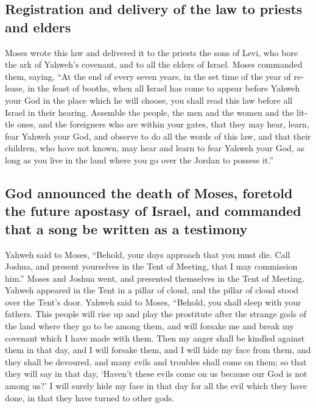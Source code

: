 \begin{paracol}{2}
\begin{otherlanguage}{english}
\hypertarget{registration-and-delivery-of-the-law-to-priests-and-elders}{%
\subsection{Registration and delivery of the law to priests and
elders}\label{registration-and-delivery-of-the-law-to-priests-and-elders}}

 Moses wrote this law and delivered it to the priests the
sons of Levi, who bore the ark of Yahweh's covenant, and to all the
elders of Israel.  Moses commanded them, saying, ``At the
end of every seven years, in the set time of the year of release, in the
feast of booths,  when all Israel has come to appear
before Yahweh your God in the place which he will choose, you shall read
this law before all Israel in their hearing.  Assemble
the people, the men and the women and the little ones, and the
foreigners who are within your gates, that they may hear, learn, fear
Yahweh your God, and observe to do all the words of this law,
 and that their children, who have not known, may hear
and learn to fear Yahweh your God, as long as you live in the land where
you go over the Jordan to possess it.''

\hypertarget{god-announced-the-death-of-moses-foretold-the-future-apostasy-of-israel-and-commanded-that-a-song-be-written-as-a-testimony}{%
\subsection{God announced the death of Moses, foretold the future
apostasy of Israel, and commanded that a song be written as a
testimony}\label{god-announced-the-death-of-moses-foretold-the-future-apostasy-of-israel-and-commanded-that-a-song-be-written-as-a-testimony}}

 Yahweh said to Moses, ``Behold, your days approach that
you must die. Call Joshua, and present yourselves in the Tent of
Meeting, that I may commission him.'' Moses and Joshua went, and
presented themselves in the Tent of Meeting.  Yahweh
appeared in the Tent in a pillar of cloud, and the pillar of cloud stood
over the Tent's door.  Yahweh said to Moses, ``Behold,
you shall sleep with your fathers. This people will rise up and play the
prostitute after the strange gods of the land where they go to be among
them, and will forsake me and break my covenant which I have made with
them.  Then my anger shall be kindled against them in
that day, and I will forsake them, and I will hide my face from them,
and they shall be devoured, and many evils and troubles shall come on
them; so that they will say in that day, `Haven't these evils come on us
because our God is not among us?'  I will surely hide my
face in that day for all the evil which they have done, in that they
have turned to other gods.


\end{otherlanguage}
\end{paracol}
